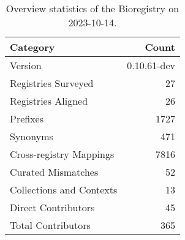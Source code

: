 \begin{table}
\caption{Overview statistics of the Bioregistry on 2023-10-14.}
\label{tab:bioregistry-summary}
\begin{tabular}{lr}
\toprule
Category & Count \\
\midrule
Version & 0.10.61-dev \\
Registries Surveyed & 27 \\
Registries Aligned & 26 \\
Prefixes & 1727 \\
Synonyms & 471 \\
Cross-registry Mappings & 7816 \\
Curated Mismatches & 52 \\
Collections and Contexts & 13 \\
Direct Contributors & 45 \\
Total Contributors & 365 \\
\bottomrule
\end{tabular}
\end{table}
